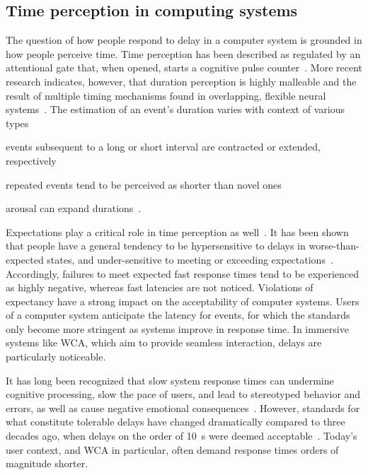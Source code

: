 \subsection{Time perception in computing systems}\label{ssec:timeperception}

The question of how people respond to delay in a computer system is grounded in how people perceive time.
Time perception has been described as regulated by an attentional gate that, when opened, starts a cognitive pulse counter~\cite{zakay1995attentional,zakay1996role}.
More recent research indicates, however, that duration perception is highly malleable and the result of multiple timing mechanisms found in overlapping, flexible neural systems~\cite{bruno2016multiple,wiener2011multiple}. 
The estimation of an event's duration varies with context of various types
\begin{enumerate*}[label={(\roman*)}, before=\unskip{: }, itemjoin={{; }}, itemjoin*={{; and }}]
    \item events subsequent to a long or short interval are contracted or extended, respectively~\cite{heron2012duration}
    \item repeated events tend to be perceived as shorter than novel ones~\cite{matthews2011stimulus}
    \item arousal can expand durations~\cite{droit2011emotion}.
\end{enumerate*}

Expectations play a critical role in time perception as well~\cite{zakay1995attentional,zakay1996role}.
It has been shown that people have a general tendency to be hypersensitive to delays in worse-than-expected states, and under-sensitive to meeting or exceeding expectations~\cite{Loewenstein1992anomaliesintertemporalchoice}.
Accordingly, failures to meet expected fast response times tend to be experienced as highly negative, whereas fast latencies are not noticed.
Violations of expectancy have a strong impact on the acceptability of computer systems.
Users of a computer system anticipate the latency for events, for which the standards only become more stringent as systems improve in response time.
In immersive systems like WCA, which aim to provide seamless interaction, delays are particularly noticeable.

It has long been recognized that slow system response times can undermine cognitive processing, slow the pace of users, and lead to stereotyped behavior and errors, as well as cause negative emotional consequences~\cite{dabrowsky:2011:40years}.
However, standards for what constitute tolerable delays have changed dramatically compared to three decades ago, when delays on the order of \SI{10}{\second} were deemed acceptable~\cite{nielsen1994usability, shneiderman2016designing, seow2008designing}.
Today's user context, and WCA in particular, often demand response times orders of magnitude shorter.

